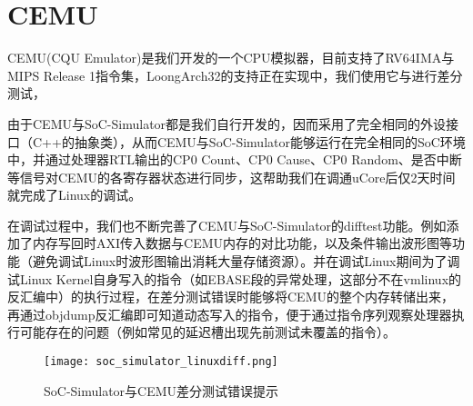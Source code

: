 \section{CEMU}

CEMU(CQU Emulator)是我们开发的一个CPU模拟器，目前支持了RV64IMA与MIPS Release 1指令集，LoongArch32的支持正在实现中，我们使用它与\cpuname 进行差分测试，

由于CEMU与SoC-Simulator都是我们自行开发的，因而采用了完全相同的外设接口（C++的抽象类），从而CEMU与SoC-Simulator能够运行在完全相同的SoC环境中，并通过处理器RTL输出的CP0 Count、CP0 Cause、CP0 Random、是否中断等信号对CEMU的各寄存器状态进行同步，这帮助我们在\cpuname 调通uCore后仅2天时间就完成了Linux的调试。

在\cpuname 调试过程中，我们也不断完善了CEMU与SoC-Simulator的difftest功能。例如添加了内存写回时AXI传入数据与CEMU内存的对比功能，以及条件输出波形图等功能（避免调试Linux时波形图输出消耗大量存储资源）。并在调试Linux期间为了调试Linux Kernel自身写入的指令（如EBASE段的异常处理，这部分不在vmlinux的反汇编中）的执行过程，在差分测试错误时能够将CEMU的整个内存转储出来，再通过objdump反汇编即可知道动态写入的指令，便于通过指令序列观察处理器执行可能存在的问题（例如常见的延迟槽出现先前测试未覆盖的指令）。

\begin{figure}[h]
    \centering
    \texttt{[image: soc\_simulator\_linuxdiff.png]}
    \caption{SoC-Simulator与CEMU差分测试错误提示}
\end{figure}